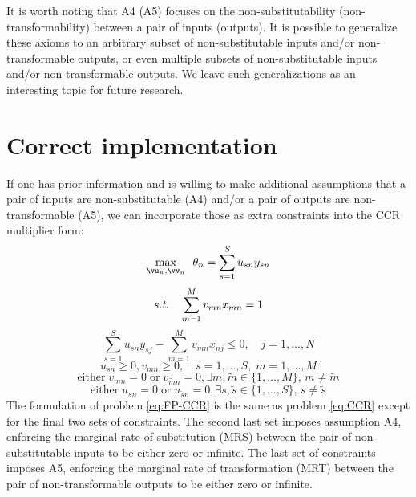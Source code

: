 {It is worth noting that A4 (A5) focuses on the non-substitutability (non-transformability) between a pair of inputs (outputs). It is possible to generalize these axioms to an arbitrary subset of non-substitutable inputs and/or non-transformable outputs, or even multiple subsets of non-substitutable inputs and/or non-transformable outputs. We leave such generalizations as an interesting topic for future research.



\section{Correct implementation}\label{sec:corr}
If one has prior information and is willing to make additional assumptions that a pair of inputs are non-substitutable (A4) and/or a pair of outputs are non-transformable (A5), we can incorporate those as extra constraints into the CCR multiplier form:
\begin{equation}\label{eq:FP-CCR}
\max_{\vu_n, \vv_n} \,\ \theta_{n}=\sum_{s=1}^S u_{sn} y_{sn}
\end{equation}
\begin{equation*}
\mbox{\textit{s.t.}}\quad
\sum_{m=1}^M v_{mn} x_{mn}=1    
\end{equation*}
\begin{equation*}
\sum_{s=1}^S u_{sn} y_{sj}-\sum_{m=1}^M v_{mn} x_{nj} \leq 0, \quad j = 1, \ldots, N
\end{equation*}
\begin{equation*}
u_{sn} \ge 0,v_{mn} \ge 0, \quad s = 1, \ldots, S, \; m = 1, \ldots, M
\end{equation*}
\begin{equation*}
\text{either}\; v_{mn}=0 \;\text{or}\; v_{\tilde{m}n}=0, \exists m,\tilde{m} \in \{1,\ldots, M\},\, m \neq \tilde{m}
\end{equation*}
\begin{equation*}
\text{either}\; u_{sn}=0 \;\text{or}\; u_{\tilde{s}n}=0, \exists s,\tilde{s} \in \{1,\ldots, S\},\, s \neq \tilde{s}
\end{equation*}
The formulation of problem \eqref{eq:FP-CCR} is the same as problem \eqref{eq:CCR} except for the final two sets of constraints. The second last set imposes assumption A4, enforcing the marginal rate of substitution (MRS) between the pair of non-substitutable inputs to be either zero or infinite. The last set of constraints imposes A5, enforcing the marginal rate of transformation (MRT) between the pair of non-transformable outputs to be either zero or infinite.

}
